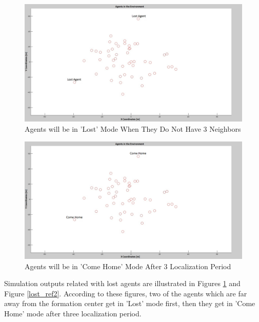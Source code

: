 \begin{figure}[H]
\caption{Agents will be in 'Lost' Mode When They Do Not Have 3 Neighbors} \label{lost_ref}
\centering
\centerline{\includegraphics[scale = 0.25]{Lost-2-2}}
\end{figure} 

\begin{figure}[H]
\captionsetup{format=hang,justification=centerfirst}
\caption{Agents will be in 'Come Home' Mode After 3 Localization Period} \label{lost_ref2} \label{come_home_ref}
\centerline{\includegraphics[scale = 0.25]{Lost-2-3}}
\end{figure} 		

Simulation outputs related with lost agents are illustrated in Figures \ref{lost_ref} and Figure \ref{lost_ref2}. According to these figures, two of the agents which are far away from the formation center get in 'Lost' mode first, then they get in 'Come Home' mode after three localization period. 
		
